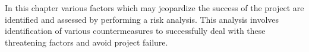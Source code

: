 In this chapter various factors which may jeopardize the success of the project are identified and assessed by performing a risk analysis. This analysis involves identification of various countermeasures to successfully deal with these threatening factors and avoid project failure.



